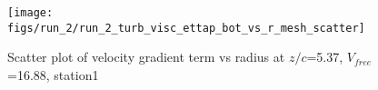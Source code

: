 \begin{figure}[H]
\centering
\texttt{[image: figs/run\_2/run\_2\_turb\_visc\_ettap\_bot\_vs\_r\_mesh\_scatter]}
\caption{Scatter plot of velocity gradient term vs radius at $z/c$=5.37, $V_{free}$=16.88, station1}
\label{fig:run_2_turb_visc_ettap_bot_vs_r_mesh_scatter}
\end{figure}


